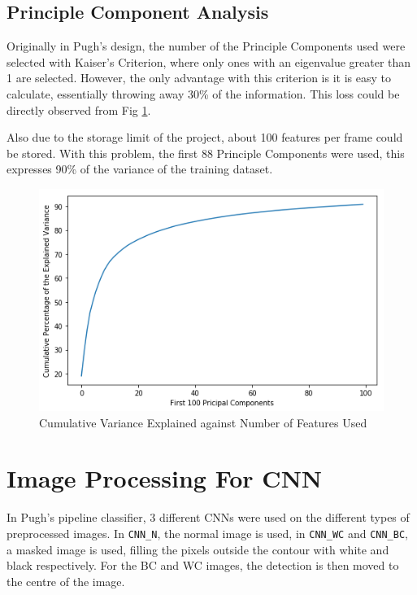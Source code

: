 \documentclass[bsc,frontabs,twoside,fullspacing,parskip,deptreport]{infthesis}
\begin{document}
\subsection{Principle Component Analysis}

Originally in Pugh's design, the number of the Principle Components used were selected with Kaiser's Criterion, where only ones with an eigenvalue greater than 1 are selected. 
However, the only advantage with this criterion is it is easy to calculate, essentially throwing away 30\% of the information. This loss could be directly observed from Fig \ref{fig:pcsused}.

Also due to the storage limit of the project, about 100 features per frame could be stored. With this problem, the first 88 Principle Components were used, this expresses 90\% of the variance of the training dataset.

\begin{figure}[ht]
\centering
    \includegraphics[scale=0.40]{graph/pcas.png}
    \caption{Cumulative Variance Explained against Number of Features Used}
    \label{fig:pcsused}
\end{figure}

\section{Image Processing For CNN}
\label{sec:CNNprepro}

In Pugh's pipeline classifier, 3 different CNNs were used on the different types of preprocessed images.
In  {\tt CNN\_N}, the normal image is used, in {\tt CNN\_WC} and {\tt CNN\_BC}, a masked image is used, filling the pixels outside the contour with white and black respectively.
For the BC and WC images, the detection is then moved to the centre of the image.
\end{document}
